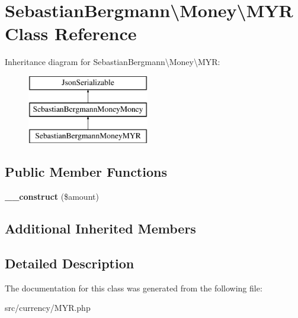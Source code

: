 \hypertarget{classSebastianBergmann_1_1Money_1_1MYR}{}\section{Sebastian\+Bergmann\textbackslash{}Money\textbackslash{}M\+Y\+R Class Reference}
\label{classSebastianBergmann_1_1Money_1_1MYR}
Inheritance diagram for Sebastian\+Bergmann\textbackslash{}Money\textbackslash{}M\+Y\+R\+:\begin{figure}[H]
\begin{center}
\leavevmode
\includegraphics[height=3.000000cm]{classSebastianBergmann_1_1Money_1_1MYR}
\end{center}
\end{figure}
\subsection*{Public Member Functions}
\begin{DoxyCompactItemize}
\item 
\hypertarget{classSebastianBergmann_1_1Money_1_1MYR_a621a2b5c55875c0ab7c84dba645e1e4f}{}{\bfseries \+\_\+\+\_\+construct} (\$amount)\label{classSebastianBergmann_1_1Money_1_1MYR_a621a2b5c55875c0ab7c84dba645e1e4f}

\end{DoxyCompactItemize}
\subsection*{Additional Inherited Members}


\subsection{Detailed Description}


The documentation for this class was generated from the following file\+:\begin{DoxyCompactItemize}
\item 
src/currency/M\+Y\+R.\+php\end{DoxyCompactItemize}

